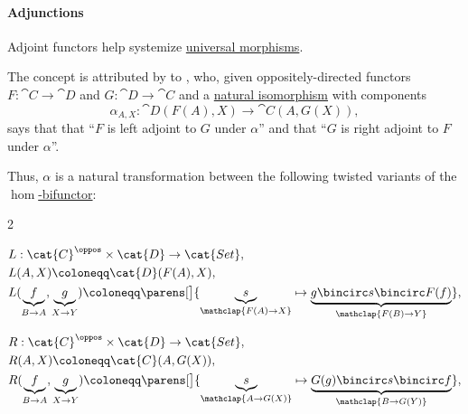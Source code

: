 \paragraph{Adjunctions}

\begin{remark}\label{rem:adjunction_of_functors}
  Adjoint functors help systemize \hyperref[def:universal_morphism]{universal morphisms}.

  \begin{thmenum}
     The concept is attributed by \textcite[79]{MacLane1998CategoryTheory} to \textcite[def. 3.1]{Kan1958AdjointFunctors}, who, given oppositely-directed functors \( F: \cat{C} \to \cat{D} \) and \( G: \cat{D} \to \cat{C} \) and a \hyperref[thm:natural_isomorphism]{natural isomorphism} with components
    \begin{equation*}
      \alpha_{A,X}: \cat{D}(F(A), X) \to \cat{C}(A, G(X)),
    \end{equation*}
    says that that \enquote{\( F \) is left adjoint to \( G \) under \( \alpha \)} and that \enquote{\( G \) is right adjoint to \( F \) under \( \alpha \)}.

    Thus, \( \alpha \) is a natural transformation between the following twisted variants of the \hyperref[def:hom_bifunctor]{\( \hom \)-bifunctor}:
    \begin{paracol}{2}
      \begin{leftcolumn}
        \ParacolAlignmentHack
        \begin{equation*}
          \begin{aligned}
            &L: \cat{C}^\oppos \times \cat{D} \to \cat{Set}, \\
            &L(A, X) \coloneqq \cat{D}(F(A), X), \\
            &L(\underbrace{f}_{B \to A}, \underbrace{g}_{X \to Y}) \coloneqq \parens[\big]{ \underbrace{s}_{\mathclap{F(A) \to X}} \mapsto \underbrace{g \bincirc s \bincirc F(f)}_{\mathclap{F(B) \to Y}} },
          \end{aligned}
        \end{equation*}
      \end{leftcolumn}

      \begin{rightcolumn}
        \ParacolAlignmentHack
        \begin{equation*}
          \begin{aligned}
            &R: \cat{C}^\oppos \times \cat{D} \to \cat{Set}, \\
            &R(A, X) \coloneqq \cat{C}(A, G(X)), \\
            &R(\underbrace{f}_{B \to A}, \underbrace{g}_{X \to Y}) \coloneqq \parens[\big]{ \underbrace{s}_{\mathclap{A \to G(X)}} \mapsto \underbrace{G(g) \bincirc s \bincirc f}_{\mathclap{B \to G(Y)}} },
          \end{aligned}
        \end{equation*}
      \end{rightcolumn}
    \end{paracol}


\end{thmenum}
\end{remark}
